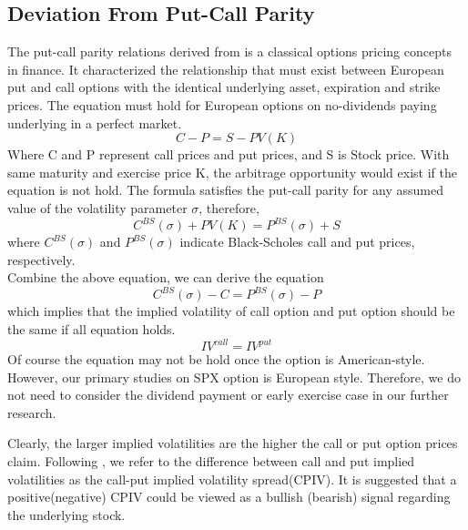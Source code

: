 
\subsection{Deviation From Put-Call Parity}
The put-call parity relations derived from \textcite{stoll1969relationship} is a classical options pricing concepts in finance. It characterized the relationship that must exist between European put and call options with the identical underlying asset, expiration and strike prices. The equation must hold for European options on no-dividends paying underlying in a perfect market. 
\begin{equation}
C-P = S - PV(K)
\end{equation}
Where C and P represent call prices and put prices, and S is Stock price. With same maturity and exercise price K, the arbitrage opportunity would exist if the equation is not hold. The \textcite{black1973pricing} formula satisfies the put-call parity for any assumed value of the volatility parameter $\sigma$, therefore, 
\begin{equation}
C^{BS}(\sigma ) + PV(K) = P^{BS}(\sigma ) + S
\end{equation}
where $C^{BS}(\sigma )$ and $P^{BS}(\sigma )$ indicate Black-Scholes call and put prices, respectively. 
\\
Combine the above equation, we can derive the equation
\begin{equation}
C^{BS}(\sigma ) - C = P^{BS}(\sigma ) - P
\end{equation}
which implies that the implied volatility of call option and put option should be the same if all equation holds. 
\begin{equation}
IV^{call} = IV^{put}
\end{equation}
Of course the equation may not be hold once the option is American-style. However, our primary studies on SPX option is European style. Therefore, we do not need to consider the dividend payment or early exercise case in our further research. 

Clearly, the larger implied volatilities are the higher the call or put option prices claim. Following \textcite{amin2004index}, we refer to the difference between call and put implied volatilities as the call-put implied volatility spread(CPIV). It is suggested that a positive(negative) CPIV could be viewed as a bullish (bearish) signal regarding the underlying stock. 

